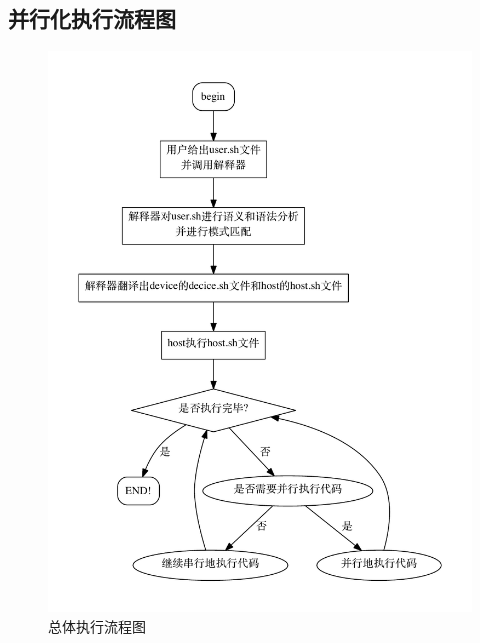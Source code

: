 \documentclass[paper=a4]{ctexart} %
\numberwithin{equation}{section} %
\numberwithin{figure}{section} %
\numberwithin{table}{section} %
\begin{document}
\subsection{并行化执行流程图}

\begin{figure}[htbp]
\centering
\includegraphics[width=1\textwidth]{pic/graph.pdf}
\caption{总体执行流程图}
\end{figure}
\end{document}
